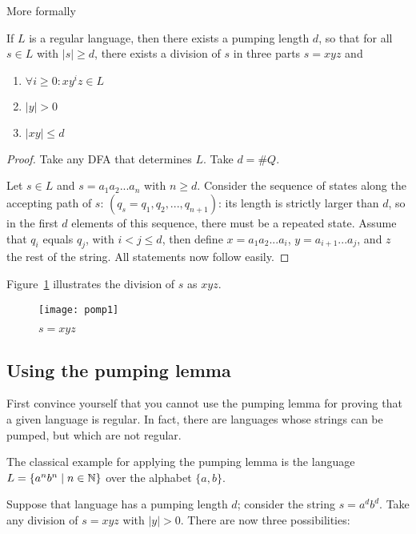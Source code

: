 More formally

\begin{theorem}
If $L$ is a regular language, then there exists a pumping length $d$,
so that
%
for all $s \in L$ with $|s| \geq d$, there exists a division of $s$ in
three parts $s = xyz$ and
\begin{enumerate}
\item
$\forall i \ge 0: xy^iz \in L$

\item
$|y| > 0$

\item
$|xy| \leq d$
\end{enumerate}
\end{theorem}
\begin{proof}
Take any DFA that determines $L$. Take $d = \#Q$.

Let $s \in L$ and $s = a_1a_2...a_n$ with $n \geq d$.
Consider the sequence of states along the accepting path of $s$:
$(q_s=q_1,q_2,...,q_{n+1})$: its length is strictly larger than $d$,
so in the first $d$ elements of this sequence, there must be a
repeated state. Assume that $q_i$ equals $q_j$, with $i < j \leq d$,
then define $x = a_1a_2...a_{i}$, $y = a_{i+1}...a_j$, and $z$ the
rest of the string. All statements now follow easily.
\end{proof}

Figure~\ref{pomp1} illustrates the division of $s$ as $xyz$.
\begin{figure}[h]
	\centering
	\texttt{[image: pomp1]}
	\caption{$s = xyz$ \label{pomp1}}
\end{figure}


\subsection{Using the pumping lemma}

First convince yourself that you cannot use the pumping lemma for
proving that a given language is regular. In fact, there are languages
whose strings can be pumped, but which are not regular.

The classical example for applying the pumping lemma is the language
$L = \{a^nb^n\mid n \in \mathbb{N}\}$ over the alphabet $\{a,b\}$.

Suppose that language has a pumping length $d$; consider the string
$s = a^db^d$. Take any division of $s = xyz$ with $|y| > 0$. There are
now three possibilities:


